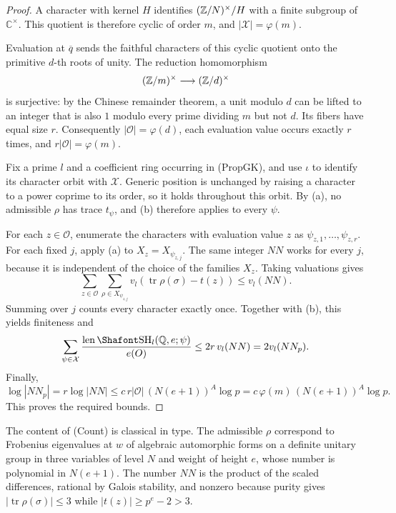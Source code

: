 \begin{proof}
A character with kernel $H$ identifies $(\mathbb Z/N)^\times/H$
with a finite subgroup of $\mathbb C^\times$.
This quotient is therefore cyclic of order $m$, and
$|\mathcal X|=\varphi(m)$.

Evaluation at $\overline q$ sends the faithful characters
of this cyclic quotient onto the primitive $d$-th roots
of unity. The reduction homomorphism
\[
(\mathbb Z/m)^\times\longrightarrow(\mathbb Z/d)^\times
\]
is surjective: by the Chinese remainder theorem, a unit
modulo $d$ can be lifted to an integer that is also
$1$ modulo every prime dividing $m$ but not $d$.
Its fibers have equal size $r$.
Consequently $|\mathcal O|=\varphi(d)$, each evaluation
value occurs exactly $r$ times, and
$r|\mathcal O|=\varphi(m)$.

Fix a prime $l$ and a coefficient ring occurring in
(PropGK), and use $\iota$ to identify its character orbit
with $\mathcal X$. Generic position is unchanged by
raising a character to a power coprime to its order,
so it holds throughout this orbit.
By (a), no admissible $\rho$ has trace $t_\psi$,
and (b) therefore applies to every $\psi$.

For each $z\in\mathcal O$, enumerate the characters
with evaluation value $z$ as
$\psi_{z,1},\ldots,\psi_{z,r}$.
For each fixed $j$, apply (a) to
$X_z=X_{\psi_{z,j}}$.
The same integer $NN$ works for every $j$, because it
is independent of the choice of the families $X_z$.
Taking valuations gives
\[
\sum_{z\in\mathcal O}
\sum_{\rho\in X_{\psi_{z,j}}}
v_l(\operatorname{tr}\rho(\sigma)-t(z))
\le v_l(NN).
\]
Summing over $j$ counts every character exactly once.
Together with (b), this yields finiteness and
\[
\sum_{\psi\in\mathcal X}
\frac{\len\Sha_l(\Q,e;\psi)}{e(O)}
\le 2r\,v_l(NN)
=2v_l(NN_p).
\]
Finally,
\[
\log|NN_p|
=r\log|NN|
\le c\,r|\mathcal O|\,(N(e+1))^A\log p
=c\,\varphi(m)\,(N(e+1))^A\log p.
\]
This proves the required bounds.
\end{proof}

The content of (Count) is classical in type. The admissible $\rho$ correspond to Frobenius eigenvalues at $w$ of algebraic automorphic forms on a definite unitary group in three variables of level $N$ and weight of height $e$, whose number is polynomial in $N(e+1)$. The number $NN$ is the product of the scaled differences, rational by Galois stability, and nonzero because purity gives $|\operatorname{tr}\rho(\sigma)|\le3$ while $|t(z)|\ge p^{e}-2>3$. 

